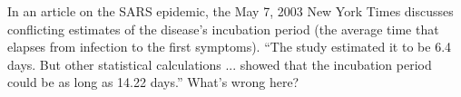 In an article on the SARS epidemic, the May 7, 2003 New
York Times discusses conflicting estimates of the disease's
incubation period (the average time that elapses from
infection to the first symptoms). ``The study estimated it
to be 6.4 days. But other statistical calculations ...
showed that the incubation period could be as long as 14.22
days.'' What's wrong here?
